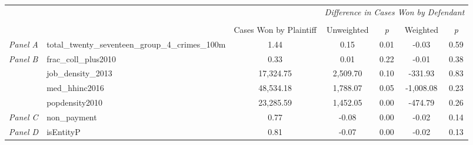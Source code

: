 \begin{tabular}{llccccc}
\toprule
 &  & \textit{} & \multicolumn{4}{c}{\textit{Difference in Cases Won by Defendant}} \\
\cline{4-7}
\\
 &  & Cases Won by Plaintiff & Unweighted & \emph{p} & Weighted & \emph{p} \\
\midrule
\textit{Panel A} & total_twenty_seventeen_group_4_crimes_100m & 1.44 & 0.15 & 0.01 & -0.03 & 0.59 \\
\cline{1-7}
\multirow[c]{4}{3cm}{\textit{Panel B}} & frac_coll_plus2010 & 0.33 & 0.01 & 0.22 & -0.01 & 0.38 \\
 & job_density_2013 & 17,324.75 & 2,509.70 & 0.10 & -331.93 & 0.83 \\
 & med_hhinc2016 & 48,534.18 & 1,788.07 & 0.05 & -1,008.08 & 0.23 \\
 & popdensity2010 & 23,285.59 & 1,452.05 & 0.00 & -474.79 & 0.26 \\
\cline{1-7}
\textit{Panel C} & non_payment & 0.77 & -0.08 & 0.00 & -0.02 & 0.14 \\
\cline{1-7}
\textit{Panel D} & isEntityP & 0.81 & -0.07 & 0.00 & -0.02 & 0.13 \\
\cline{1-7}
\bottomrule
\end{tabular}
